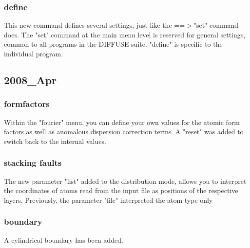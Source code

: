 \subsubsection{define}
\par
This new command defines several settings, just like the ==$> $"set" 
command does. The "set" command at the main menu level is reserved 
for general settings, common to all programs in the DIFFUSE suite. 
"define" is specific to the individual program. 
\subsection*{2008\_Apr}
\subsubsection{formfactors}
Within the "fourier" menu, you can define your own values for 
the atomic form factors as well as anomalous dispersion correction 
terms. A "reset" was added to switch back to the internal values. 
\subsubsection{stacking faults}
\par
The new parameter "list" added to the distribution mode, allows 
you to interpret the coordinates of atoms read from the input 
file as positions of the respective layers. 
Previously, the parameter "file" interpreted the atom type only 
\subsubsection{boundary}
\par
A cylindrical boundary has been added. 
